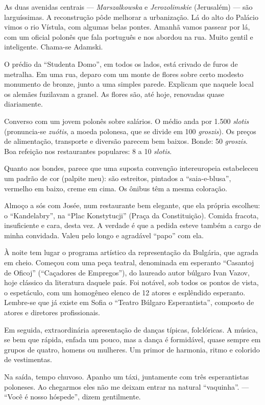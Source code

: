 As duas avenidas centrais --- \textit{Marszalkowska} e \textit{Jerozolimskie} (Jerusalém) --- são larguíssimas. A reconstrução pôde melhorar a urbanização. Lá do alto do Palácio vimos o rio Vístula, com algumas belas pontes. Amanhã vamos passear por lá, com um oficial polonês que fala português e nos abordou na rua. Muito gentil e inteligente. Chama-se Adamski.

O prédio da ``Studenta Domo'', em todos os lados, está crivado de furos de metralha. Em uma rua, deparo com um monte de flores sobre certo modesto monumento de bronze, junto a uma simples parede. Explicam que naquele local os alemães fuzilavam a granel. As flores são, até hoje, renovadas quase diariamente.

Converso com um jovem polonês sobre salários. O médio anda por 1.500 \textit{slotis} (pronuncia-se \textit{zuótis}, a moeda polonesa, que se divide em 100 \textit{groszis}). Os preços de alimentação, transporte e diversão parecem bem baixos. Bonde: 50 \textit{groszis}. Boa refeição nos restaurantes populares: 8 a 10 \textit{slotis}.

Quanto aos bondes, parece que uma suposta convenção intereuropeia estabeleceu um padrão de cor (palpite meu): são estreitos, pintados a ``saia-e-blusa'', vermelho em baixo, creme em cima. Os ônibus têm a mesma coloração.

Almoço a sós com Josée, num restaurante bem elegante, que ela própria escolheu: o ``Kandelabry'', na ``Plac Konstytucji'' (Praça da Constituição). Comida fracota, insuficiente e cara, desta vez. A verdade é que a pedida esteve também a cargo de minha convidada. Valeu pelo longo e agradável ``papo'' com ela.

À noite tem lugar o programa artístico da representação da Bulgária, que agrada em cheio. Começou com uma peça teatral, denominada em esperanto ``Casantoj de Oficoj'' (``Caçadores de Empregos''), do laureado autor búlgaro Ivan Vazov, hoje clássico da literatura daquele país. Foi notável, sob todos os pontos de vista, o espetáculo, com um homogêneo elenco de 12 atores e esplêndido esperanto. Lembre-se que já existe em Sofia o ``Teatro Búlgaro Esperantista'', composto de atores e diretores profissionais.

Em seguida, extraordinária apresentação de danças típicas, folclóricas. A música, se bem que rápida, enfada um pouco, mas a dança é formidável, quase sempre em grupos de quatro, homens ou mulheres. Um primor de harmonia, ritmo e colorido de vestimentas.

Na saída, tempo chuvoso. Apanho um táxi, juntamente com três esperantistas poloneses. Ao chegarmos eles não me deixam entrar na natural ``vaquinha''. --- ``Você é nosso hóspede'', dizem gentilmente.


